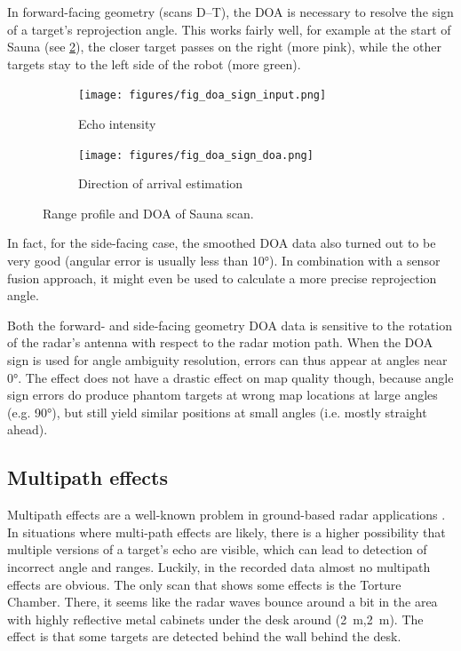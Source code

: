 In forward-facing geometry (scans D--T), the DOA is necessary to resolve
the sign of a target's reprojection angle. This works fairly well, for
example at the start of Sauna (see \cref{fig:sauna_doa}), the closer target
passes on the right (more pink), while the other targets stay to the
left side of the robot (more green).

\begin{figure}[htbp]
    \centering
    \begin{subfigure}[b]{0.45\textwidth}
        \texttt{[image: figures/fig\_doa\_sign\_input.png]}
        \caption{\label{fig:sauna_input}Echo intensity}
    \end{subfigure}%
    \hfill%
    \begin{subfigure}[b]{0.45\textwidth}
        \texttt{[image: figures/fig\_doa\_sign\_doa.png]}
        \caption{\label{fig:sauna_doa}Direction of arrival estimation}
    \end{subfigure}
    \caption{Range profile and DOA of Sauna scan.}
    \label{fig:sauna}
\end{figure}

In fact, for the side-facing case, the smoothed DOA data also turned out
to be very good (angular error is usually less than \ang{10}). In combination with a sensor fusion approach, it might even be used to calculate a more precise
reprojection angle.

Both the forward- and side-facing geometry DOA data is sensitive to the rotation of the radar's antenna with respect to the radar motion path. When the DOA sign is used for angle ambiguity resolution, errors can thus appear at angles near \ang{0}. The effect does not have a drastic effect on map quality though, because angle sign errors do produce phantom targets at wrong map locations at large angles (e.g. \ang{90}), but still yield similar positions at small angles (i.e. mostly straight ahead).

\subsection{Multipath effects}\label{multipath-effects}

Multipath effects are a well-known problem in ground-based radar
applications \cite{Adams2012}. In situations where multi-path effects
are likely, there is a higher possibility that multiple versions of a
target's echo are visible, which can lead to detection of incorrect
angle and ranges. Luckily, in the recorded data almost no multipath
effects are obvious. The only scan that shows some effects is the
Torture Chamber. There, it seems like the radar waves bounce around a
bit in the area with highly reflective metal cabinets under the desk around (\SI{2}{m},\SI{2}{m}). The effect is that some targets are detected behind the wall behind the desk.

